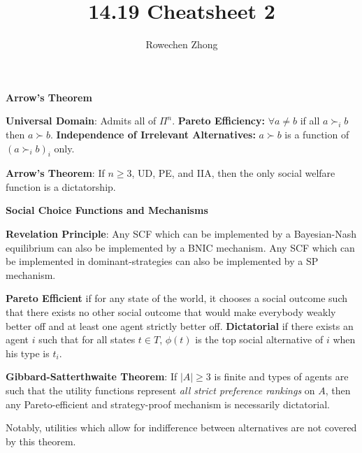 \documentclass[8pt]{scrartcl}
\title{14.19 Cheatsheet 2}
\author{Rowechen Zhong}
\date{}
\newcommand{\vocab}[1]{\textbf{\color{blue} #1}}
\renewcommand{\section}[1]{\begin{center}\textbf{\color{red}#1}\end{center}}
\begin{document}
\maketitle
\begin{multicols*}{2}

    \section{Arrow's Theorem}
    \vocab{Universal Domain}: Admits all of $\Pi^n$.
    \vocab{Pareto Efficiency:} $\forall a\neq b$ if all $a \succ_i b$ then $a\succ b$.
    \vocab{Independence of Irrelevant Alternatives:}
    $a\succ b$ is a function of $\left(a\succ_i b\right)_i$ only.

    \vocab{Arrow's Theorem}: If $n\geq 3$, UD, PE, and IIA,
    then the only social welfare function is a dictatorship.
    \section{Social Choice Functions and Mechanisms}

    \vocab{Revelation Principle}: Any SCF which can be implemented by a Bayesian-Nash
    equilibrium can also be implemented by a BNIC mechanism. Any SCF which can be
    implemented in dominant-strategies can also be implemented by a SP mechanism.

    \vocab{Pareto Efficient} if for any state of the world, it chooses a social outcome
    such that there exists no other social outcome that would
    make everybody weakly better off and at least one agent strictly better off.
    \vocab{Dictatorial} if there exists an agent $i$ such that for all
    states $t \in T$, $\phi(t)$ is the top social alternative of $i$ when his type is $t_i$.

    \vocab{Gibbard-Satterthwaite Theorem}: If $|A| \geq 3$ is finite and types of agents
    are such that the utility functions represent \emph{all strict preference rankings} on $A$,
    then any Pareto-efficient and strategy-proof mechanism is necessarily dictatorial.

    Notably, utilities which allow for indifference
    between alternatives are not covered by this theorem.


\end{multicols*}
\end{document}
